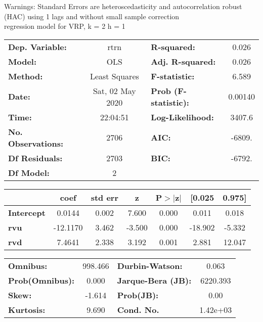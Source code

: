 Warnings: \newline
 [1] Standard Errors are heteroscedasticity and autocorrelation robust (HAC) using 1 lags and without small sample correction\\ 

regression model for VRP, k = 2 h = 1\begin{center}
\begin{tabular}{lclc}
\toprule
\textbf{Dep. Variable:}    &       rtrn       & \textbf{  R-squared:         } &     0.026   \\
\textbf{Model:}            &       OLS        & \textbf{  Adj. R-squared:    } &     0.026   \\
\textbf{Method:}           &  Least Squares   & \textbf{  F-statistic:       } &     6.589   \\
\textbf{Date:}             & Sat, 02 May 2020 & \textbf{  Prob (F-statistic):} &  0.00140    \\
\textbf{Time:}             &     22:04:51     & \textbf{  Log-Likelihood:    } &    3407.6   \\
\textbf{No. Observations:} &        2706      & \textbf{  AIC:               } &    -6809.   \\
\textbf{Df Residuals:}     &        2703      & \textbf{  BIC:               } &    -6792.   \\
\textbf{Df Model:}         &           2      & \textbf{                     } &             \\
\bottomrule
\end{tabular}
\begin{tabular}{lcccccc}
                   & \textbf{coef} & \textbf{std err} & \textbf{z} & \textbf{P$> |$z$|$} & \textbf{[0.025} & \textbf{0.975]}  \\
\midrule
\textbf{Intercept} &       0.0144  &        0.002     &     7.600  &         0.000        &        0.011    &        0.018     \\
\textbf{rvu}       &     -12.1170  &        3.462     &    -3.500  &         0.000        &      -18.902    &       -5.332     \\
\textbf{rvd}       &       7.4641  &        2.338     &     3.192  &         0.001        &        2.881    &       12.047     \\
\bottomrule
\end{tabular}
\begin{tabular}{lclc}
\textbf{Omnibus:}       & 998.466 & \textbf{  Durbin-Watson:     } &    0.063  \\
\textbf{Prob(Omnibus):} &   0.000 & \textbf{  Jarque-Bera (JB):  } & 6220.393  \\
\textbf{Skew:}          &  -1.614 & \textbf{  Prob(JB):          } &     0.00  \\
\textbf{Kurtosis:}      &   9.690 & \textbf{  Cond. No.          } & 1.42e+03  \\
\bottomrule
\end{tabular}
\end{center}

